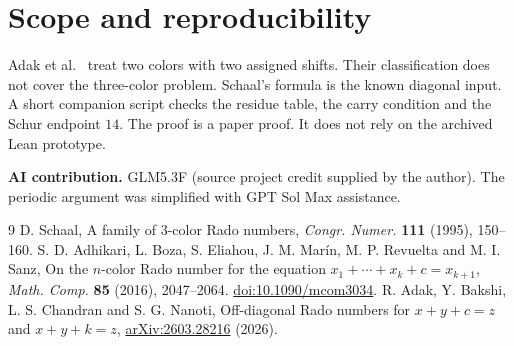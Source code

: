 \documentclass[11pt]{article}
\begin{document}
\section{Scope and reproducibility}
Adak et al.~\cite{adak} treat two colors with two assigned shifts. Their
classification does not cover the three-color problem. Schaal's formula
is the known diagonal input. A short companion script checks the residue
table, the carry condition and the Schur endpoint $14$. The proof is a
paper proof. It does not rely on the archived Lean prototype.

\textbf{AI contribution.} GLM5.3F (source project credit supplied by the
author). The periodic argument was simplified with GPT Sol Max assistance.

\begin{thebibliography}{9}
 D. Schaal, A family of 3-color Rado numbers,
\emph{Congr. Numer.} \textbf{111} (1995), 150--160.
 S. D. Adhikari, L. Boza, S. Eliahou, J. M. Marín,
M. P. Revuelta and M. I. Sanz, On the $n$-color Rado number for the equation
$x_1+\cdots+x_k+c=x_{k+1}$, \emph{Math. Comp.} \textbf{85} (2016),
2047--2064. \href{https://doi.org/10.1090/mcom3034}{doi:10.1090/mcom3034}.
 R. Adak, Y. Bakshi, L. S. Chandran and S. G. Nanoti, Off-diagonal Rado numbers for
$x+y+c=z$ and $x+y+k=z$, \href{https://arxiv.org/abs/2603.28216}{arXiv:2603.28216} (2026).
\end{thebibliography}
\end{document}
